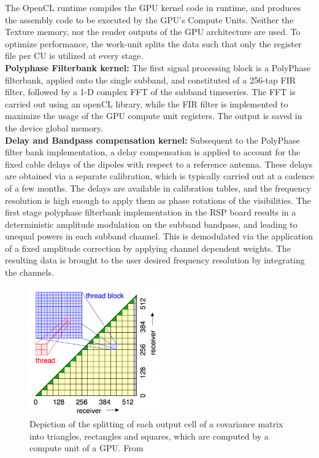 \documentclass{ws-jai}
\begin{document}
 The  OpenCL  runtime compiles  the GPU  kernel code  in runtime,  and
produces the  assembly code to be  executed by the GPU's  Compute Units. Neither
the Texture memory, nor the render outputs  of the GPU architecture are used. To
optimize performance, the work-unit splits the  data such that only the register
file per CU is utilized at every stage.\\

\noindent  \textbf {Polyphase  Filterbank kernel:}  The first  signal processing
block  is  a  PolyPhase  filterbank,   applied  onto  the  single  subband,  and
constituted  of a  256-tap FIR  filter, followed  by a  1-D complex  FFT of  the
subband timeseries.  The FFT is carried  out using an openCL  library, while the
FIR  filter  is implemented  to  maximize  the usage  of  the  GPU compute  unit
registers. The output is saved in the device global memory.\\

\noindent \textbf  {Delay and Bandpass  compensation kernel:} Subsequent  to the
PolyPhase filter bank implementation, a delay compensation is applied to account
for the fixed cable  delays of the dipoles with respect  to a reference antenna.
These delays are obtained via a separate calibration, which is typically carried
out at  a cadence  of a  few months.   The delays  are available  in calibration
tables,  and the  frequency resolution  is high  enough to  apply them  as phase
rotations   of  the   visibilities.   The  first   stage  polyphase   filterbank
implementation in the RSP board  results in a deterministic amplitude modulation
on the subband bandpass, and leading  to unequal powers in each subband channel.
This  is demodulated  via the  application of  a fixed  amplitude correction  by
applying channel  dependent weights. The resulting  data is brought to  the user
desired frequency resolution by integrating the channels.\\

\begin{figure}[htbp]
\centering
\includegraphics[width=0.5\textwidth]{Figs/ACM_spatial_split.png}
\caption {Depiction of the splitting of each output cell of a covariance matrix into triangles, rectangles and squares, which are computed by a compute unit of a GPU. From \cite{romein2016comparison}}
\label{fig:acm_spatial_split}
\end{figure}
\end{document}
